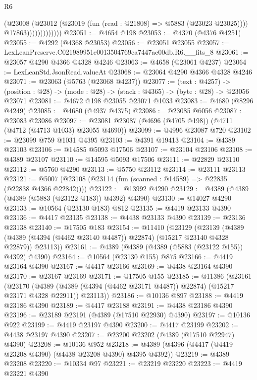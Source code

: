 \begin{lexlean}{R6}
\begin{coremodule}
                            (@23008
                              (@23012 (@23019 (fun (read : @21808) => @5883 (@23023 @23025))))
                              @17863)))))))))))))
@23051 := @4654 @198
@23053 := @4370 (@4376 @4251)
@23055 := @4292 (@4368 @23053)
@23056 := @23051 @23055
@23057 := LexLeanPreserve.C021989951e0013504769ca7447ac00db.R6.__fits_8
@23061 := @23057 @4290 @4366 @4328 @4246
@23063 := @4658 (@23061 @4237)
@23064 := LexLeanStd.JsonRead.valueAt
@23068 := @23064 @4290 @4366 @4328 @4246
@23071 := @23063 (@5763 (@23068 @4237))
@23077 := (text : @4257) ->
  (position : @28) -> (mode : @28) -> (stack : @4365) -> (byte : @28) -> @23056 @23071
@23081 := @4672 @198 @23055 @23071 @1033
@23083 := @4680 (@8296 @4249)
@23085 := @4680 (@4937 @4375)
@23086 := @23085 @6056
@23087 := @23083 @23086
@23097 := @23081 @23087 (@4696 (@4705 @198)) (@4711 (@4712 (@4713 @1033) @23055 @4690))
@23099 := @4996 @23087 @720
@23102 := @23099 @759 @1031 @4395
@23103 := @4391 @19413
@23104 := @4389 @23103
@23106 := @14585 @5093 @17506
@23107 := @23104 @23106
@23108 := @4389 @23107
@23110 := @14595 @5093 @17506
@23111 := @22829 @23110
@23112 := @5760 @4290
@23113 := @5750 @23112
@23114 := @23111 @23113
@23121 := @5007 (@23108 (@23114 (fun (scanned : @14589) => @22835 (@22838 @4366 @22842))))
@23122 := @13992 @4290
@23129 := @4389 (@4389 (@4389 (@5883 (@23122 @183)) @4392) @4390)
@23130 := @14027 @4290
@23133 := @10564 (@23130 @183) @812
@23135 := @4419 @23133 @4390
@23136 := @4417 @23135
@23138 := @4438 @23133 @4390
@23139 := @23136 @23138
@23140 := @17505 @183
@23154 := @11410
    (@23129
      (@23139
        (@4389 (@4389 (@4394 (@4462 @23140 @4487)) @22874) (@15217 @23140 @4328 @22879))
        @23113))
@23161 := @4389 (@4389 (@4389 (@5883 (@23122 @155)) @4392) @4390)
@23164 := @10564 (@23130 @155) @875
@23166 := @4419 @23164 @4390
@23167 := @4417 @23166
@23169 := @4438 @23164 @4390
@23170 := @23167 @23169
@23171 := @17505 @155
@23185 := @11386
    (@23161
      (@23170
        (@4389 (@4389 (@4394 (@4462 @23171 @4487)) @22874) (@15217 @23171 @4328 @22911))
        @23113))
@23186 := @10136 @897
@23188 := @4419 @23186 @4390
@23189 := @4417 @23188
@23191 := @4438 @23186 @4390
@23196 := @23189 @23191 (@4389 (@17510 @22930) @4390)
@23197 := @10136 @922
@23199 := @4419 @23197 @4390
@23200 := @4417 @23199
@23202 := @4438 @23197 @4390
@23207 := @23200 @23202 (@4389 (@17510 @22947) @4390)
@23208 := @10136 @952
@23218 := @4389 (@4396 (@4417 (@4419 @23208 @4390) (@4438 @23208 @4390) @4395 @4392))
@23219 := @4389 @23208
@23220 := @10334 @97
@23221 := @23219 @23220
@23223 := @4419 @23221 @4390

\end{coremodule}
\end{lexlean}
